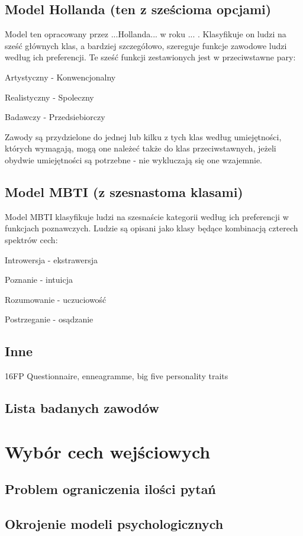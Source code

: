 \documentclass[12pt,a4paper,oneside]{report} %
\begin{document}
\section{Model Hollanda (ten z sześcioma opcjami)}
Model ten opracowany przez ...Hollanda... w roku ... . Klasyfikuje on ludzi na sześć głównych klas, a bardziej szczegółowo, szereguje funkcje zawodowe ludzi według ich preferencji. Te sześć funkcji zestawionych jest w przeciwstawne pary:\par
Artystyczny - Konwencjonalny\par
Realistyczny - Spoleczny\par
Badawczy - Przedsiebiorczy\par
Zawody są przydzielone do jednej lub kilku z tych klas według umiejętności, których wymagają, mogą one należeć także do klas przeciwstawnych, jeżeli obydwie umiejętności są potrzebne - nie wykluczają się one wzajemnie.\par
\section{Model MBTI (z szesnastoma klasami)}
Model MBTI klasyfikuje ludzi na szesnaście kategorii według ich preferencji w funkcjach poznawczych. Ludzie są opisani jako klasy będące kombinacją czterech spektrów cech:\par
Introwersja - ekstrawersja\par
Poznanie - intuicja\par
Rozumowanie - uczuciowość\par
Postrzeganie - osądzanie\par
\section{Inne}
16FP Questionnaire, enneagramme, big five personality traits
\section{Lista badanych zawodów}
\chapter{Wybór cech wejściowych}
\section{Problem ograniczenia ilości pytań}
\section{Okrojenie modeli psychologicznych}
\end{document}
